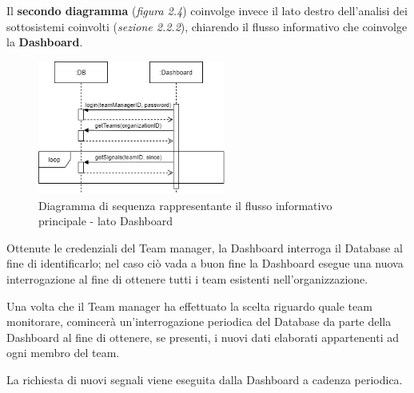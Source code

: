 \vspace{50mm}
\noindent Il {\bf secondo diagramma} (\emph{figura 2.4}) coinvolge invece il lato destro dell'analisi dei sottosistemi coinvolti (\emph{sezione 2.2.2}), chiarendo il flusso informativo che coinvolge la {\bf Dashboard}.
\vspace{10mm}
\begin{figure}[H]
  \centering
  \includegraphics[width=0.55\textwidth]{img/diagramma_sequenza_alto_dashboard.png}
  \caption{Diagramma di sequenza rappresentante il flusso informativo principale - lato Dashboard}
\end{figure}
\vspace{5mm}
\noindent Ottenute le credenziali del Team manager, la Dashboard interroga il Database al fine di identificarlo; nel caso ciò vada a buon fine la Dashboard esegue una nuova interrogazione al fine di ottenere tutti i team esistenti nell'organizzazione.\newline

\noindent Una volta che il Team manager ha effettuato la scelta riguardo quale team monitorare, comincerà un'interrogazione periodica del Database da parte della Dashboard al fine di ottenere, se presenti, i nuovi dati elaborati appartenenti ad ogni membro del team.\newline

\noindent La richiesta di nuovi segnali viene eseguita dalla Dashboard a cadenza periodica.
\vspace{50mm}
